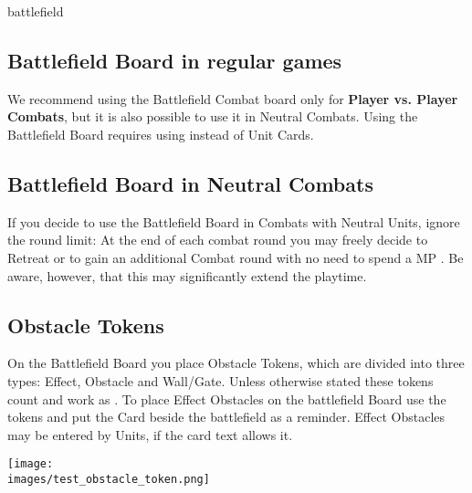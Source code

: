 \begin{expansion}{battlefield}
  \begin{multicols*}{2}
  \subsection*{Battlefield Board in regular games}
  We recommend using the Battlefield Combat board only for \textbf{Player vs. Player Combats}, but it is also possible to use it in Neutral Combats.
  Using the Battlefield Board requires using  instead of Unit Cards.

  \medskip
  \subsection*{Battlefield Board in Neutral Combats}
  If you decide to use the Battlefield Board in Combats with Neutral Units, ignore the round limit:
  At the end of each combat round you may freely decide to Retreat or to gain an additional Combat round with no need to spend a MP .
  Be aware, however, that this may significantly extend the playtime.

  \medskip
  \subsection*{Obstacle Tokens}
  On the Battlefield Board you place Obstacle Tokens, which are divided into three types:
  Effect, Obstacle and Wall/Gate.
  Unless otherwise stated these tokens count and work as .
  To place Effect Obstacles on the battlefield Board use the tokens and put the Card beside the battlefield as a reminder.
  Effect Obstacles may be entered by Units, if the card text allows it.
  \vspace*{1em}
  \begin{center}
  \texttt{[image: \\images/test\_obstacle\_token.png]}
  \end{center}
  \vspace*{1em}
  \columnbreak


\end{multicols*}
\end{expansion}
